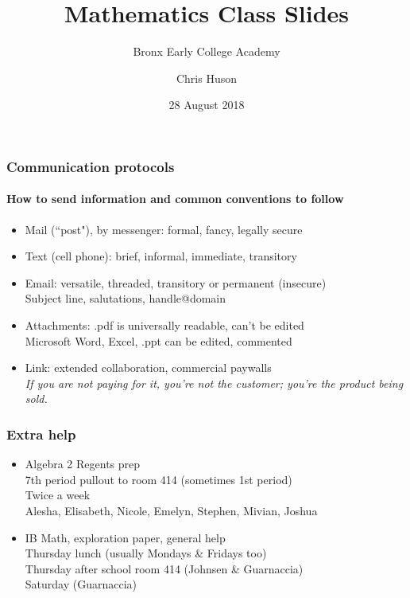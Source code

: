 \documentclass{beamer}
\title{Mathematics Class Slides}
\subtitle{Bronx Early College Academy}
\author{Chris Huson}
\date{28 August 2018}
\begin{document}
\frame{\titlepage}

\frame
{
  \frametitle{Communication protocols}
  \framesubtitle{How to send information and common conventions to follow}
\begin{itemize}
      \item Mail (``post"), by messenger: formal, fancy, legally secure
      \item Text (cell phone): brief, informal, immediate, transitory
      \item Email: versatile, threaded, transitory or permanent (insecure)\\
      Subject line, salutations, handle@domain
      \item Attachments: .pdf is universally readable, can't be edited\\
      Microsoft Word, Excel, .ppt can be edited, commented
      \item Link: extended collaboration, commercial paywalls\\
      \emph{If you are not paying for it, you're not the customer; you're the product being sold.}
\end{itemize}
 }


\frame
{
  \frametitle{Extra help}
\begin{itemize}
      \item Algebra 2 Regents prep\\
      7th period pullout to room 414 (sometimes 1st period)\\
      Twice a week\\
      Alesha, Elisabeth, Nicole, Emelyn, Stephen, Mivian, Joshua\\[20pt]
      \item IB Math, exploration paper, general help\\
      Thursday lunch (usually Mondays \& Fridays too)\\
      Thursday after school room 414 (Johnsen \& Guarnaccia)\\
      Saturday (Guarnaccia)
\end{itemize}
 }
\end{document}
